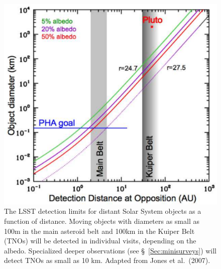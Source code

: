 \documentclass{emulateapj}
\begin{document}
\begin{figure}
\includegraphics[width=1.0\hsize,clip]{Af9.pdf}
\caption{The LSST detection limits for distant Solar System objects as
  a function of distance.
Moving objects with diameters as small as 100m in the main asteroid belt and 
100km in the Kuiper Belt (TNOs) will be detected in individual visits,
depending on the albedo. Specialized deeper observations  
(see \S~\ref{Sec:minisurveys}) will detect TNOs as small as 10 km. Adapted from 
Jones et al.~(2007).} 
\label{Fig:Af9}
\end{figure}
\end{document}

